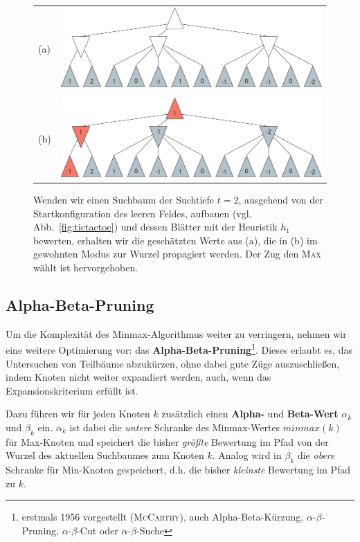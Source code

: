 \documentclass[a4paper,twoside]{scrartcl}
\newcommand\q[1]{\glqq #1\grqq}
\begin{document}
\begin{figure}[!ht]
  \centering
  \begin{tabular}{ll}
    (a) & \includegraphics[width=.8\textwidth]{minmax_heuristik.pdf}\\
        & \\
    (b) & \includegraphics[width=.8\textwidth]{minmax_heuristik_2.pdf}
  \end{tabular}
  \caption{Wenden wir einen Suchbaum der Suchtiefe $t = 2$, ausgehend von der Startkonfiguration des leeren Feldes, aufbauen (vgl. Abb.~\ref{fig:tictactoe}) und dessen Blätter mit der Heuristik $h_1$ bewerten, erhalten wir die geschätzten Werte aus (a), die in (b) im gewohnten Modus zur Wurzel propagiert werden. Der Zug den \textsc{Max} wählt ist hervorgehoben.\label{fig:heuristic}}
\end{figure}


\subsection{Alpha-Beta-Pruning}

Um die Komplexität des Minmax-Algorithmus weiter zu verringern, nehmen wir eine weitere Optimierung vor: das \textbf{Alpha-Beta-Pruning}\footnote{erstmals 1956 vorgestellt (\textsc{McCarthy}), auch \q{Alpha-Beta-Kürzung}, \q{$\alpha$-$\beta$-Pruning}, \q{$\alpha$-$\beta$-Cut} oder \q{$\alpha$-$\beta$-Suche}}. Dieses erlaubt es, das Untersuchen von Teilbäume abzukürzen, ohne dabei gute Züge auszuschließen, indem Knoten nicht weiter expandiert werden, auch, wenn das Expansionskriterium erfüllt ist. 

Dazu führen wir für jeden Knoten $k$ zusätzlich einen \textbf{Alpha-} und \textbf{Beta-Wert} $\alpha_k$ und $\beta_k$ ein. $\alpha_k$ ist dabei die \textit{untere} Schranke des Minmax-Wertes $minmax(k)$ für Max-Knoten und speichert die bisher \textit{größte} Bewertung im Pfad von der Wurzel des aktuellen Suchbaumes zum Knoten $k$. Analog wird in $\beta_k$ die \textit{obere} Schranke für Min-Knoten gespeichert, d.h. die bisher \textit{kleinste} Bewertung im Pfad zu $k$.
\end{document}
